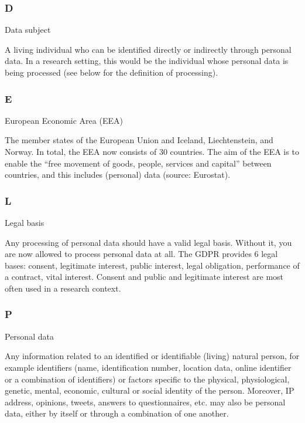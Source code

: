 \documentclass[
]{book}
\begin{document}
\hypertarget{d}{%
\subsubsection{D}\label{d}}

Data subject

A living individual who can be identified directly or indirectly through personal data. In a research setting,
this would be the individual whose personal data is being processed (see below for the definition of processing).

\hypertarget{e}{%
\subsubsection{E}\label{e}}

European Economic Area (EEA)

The member states of the European Union and Iceland, Liechtenstein, and Norway. In total, the EEA now consists of
30 countries. The aim of the EEA is to enable the ``free movement of goods, people, services and capital'' between countries,
and this includes (personal) data (source:
Eurostat).

\hypertarget{l}{%
\subsubsection{L}\label{l}}

Legal basis

Any processing of personal data should have a valid legal basis. Without it, you are now allowed to process personal data at all.
The GDPR provides 6 legal bases: consent, legitimate interest, public interest, legal obligation, performance of a contract, vital
interest. Consent and public and legitimate interest are most often used in a research context.

\hypertarget{p}{%
\subsubsection{P}\label{p}}

Personal data

Any information related to an identified or identifiable (living) natural person, for example identifiers (name, identification number,
location data, online identifier or a combination of identifiers) or factors specific to the physical, physiological, genetic, mental,
economic, cultural or social identity of the person. Moreover, IP address, opinions, tweets, answers to questionnaires, etc. may also be
personal data, either by itself or through a combination of one another.
\end{document}
